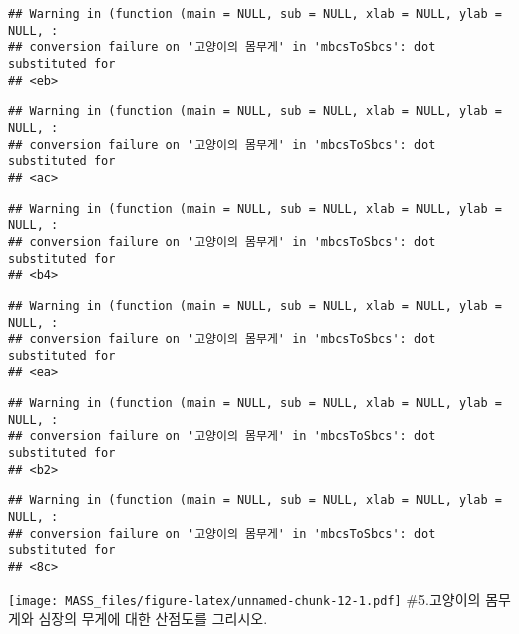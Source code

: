 \documentclass[
]{article}
\newenvironment{Shaded}{\begin{snugshade}}{\end{snugshade}}
\newcommand{\AttributeTok}[1]{\textcolor[rgb]{0.13,0.29,0.53}{#1}}
\newcommand{\DecValTok}[1]{\textcolor[rgb]{0.00,0.00,0.81}{#1}}
\newcommand{\FunctionTok}[1]{\textcolor[rgb]{0.13,0.29,0.53}{\textbf{#1}}}
\newcommand{\NormalTok}[1]{#1}
\newcommand{\SpecialCharTok}[1]{\textcolor[rgb]{0.81,0.36,0.00}{\textbf{#1}}}
\newcommand{\StringTok}[1]{\textcolor[rgb]{0.31,0.60,0.02}{#1}}
\begin{document}
\begin{verbatim}
## Warning in (function (main = NULL, sub = NULL, xlab = NULL, ylab = NULL, :
## conversion failure on '고양이의 몸무게' in 'mbcsToSbcs': dot substituted for
## <eb>
\end{verbatim}

\begin{verbatim}
## Warning in (function (main = NULL, sub = NULL, xlab = NULL, ylab = NULL, :
## conversion failure on '고양이의 몸무게' in 'mbcsToSbcs': dot substituted for
## <ac>
\end{verbatim}

\begin{verbatim}
## Warning in (function (main = NULL, sub = NULL, xlab = NULL, ylab = NULL, :
## conversion failure on '고양이의 몸무게' in 'mbcsToSbcs': dot substituted for
## <b4>
\end{verbatim}

\begin{verbatim}
## Warning in (function (main = NULL, sub = NULL, xlab = NULL, ylab = NULL, :
## conversion failure on '고양이의 몸무게' in 'mbcsToSbcs': dot substituted for
## <ea>
\end{verbatim}

\begin{verbatim}
## Warning in (function (main = NULL, sub = NULL, xlab = NULL, ylab = NULL, :
## conversion failure on '고양이의 몸무게' in 'mbcsToSbcs': dot substituted for
## <b2>
\end{verbatim}

\begin{verbatim}
## Warning in (function (main = NULL, sub = NULL, xlab = NULL, ylab = NULL, :
## conversion failure on '고양이의 몸무게' in 'mbcsToSbcs': dot substituted for
## <8c>
\end{verbatim}

\texttt{[image: MASS\_files/figure-latex/unnamed-chunk-12-1.pdf]}
\#5.고양이의 몸무게와 심장의 무게에 대한 산점도를 그리시오.

\begin{Shaded}
\end{Shaded}
\end{document}
